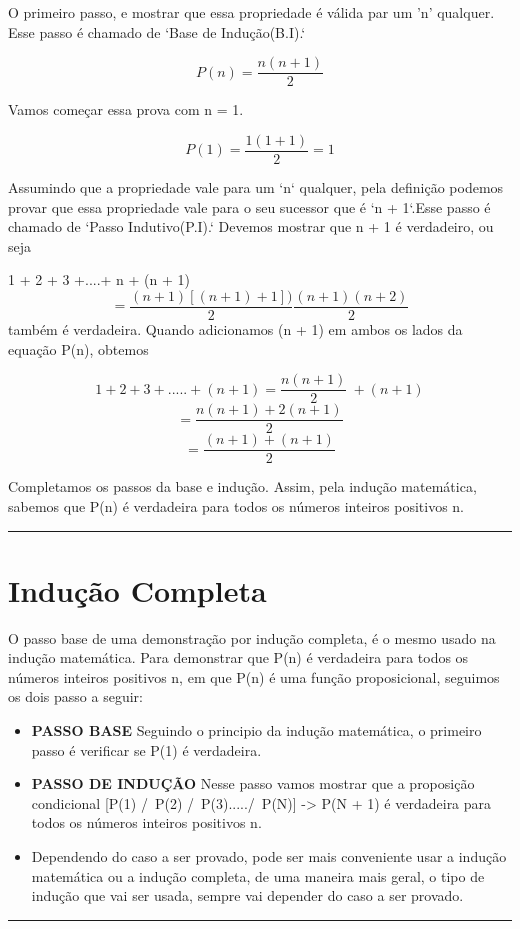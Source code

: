 \documentclass[a4paper, 10pt]{article}
\begin{document}
\begin{itemize}
\item O primeiro passo, e mostrar que essa propriedade é válida par um 'n' qualquer.
  Esse passo é chamado de `Base de Indução(B.I).`
  \begin{center}
    \[P(n)=\frac{n(n + 1)}{2}\]

    Vamos começar essa prova com n = 1.

    \[P(1) = \frac {1(1 + 1)}{2} = 1\]
  \end{center}
\item Assumindo que a propriedade vale para um `n` qualquer, pela definição podemos provar que essa propriedade vale para o seu sucessor que é `n + 1`.Esse passo é chamado de `Passo Indutivo(P.I).`
  Devemos mostrar que n + 1 é verdadeiro, ou seja
  \begin{center}
    1 + 2 + 3 +....+ n + (n + 1) \[ = \frac{(n + 1) [(n + 1) + 1])}{2}\frac{(n +1)(n + 2)}{2}\]
    também é verdadeira. Quando adicionamos (n + 1) em ambos os lados da equação P(n), obtemos

    \[1 + 2 + 3 +.....+ (n + 1) = \frac{n(n + 1)}{2}\ + (n + 1)\]
    \[ = \frac{n(n + 1) + 2(n + 1)}{2}\]
    \[ = \frac{(n + 1) + (n + 1)}{2}\]
    \item Completamos os passos da base e indução. Assim, pela indução matemática, sabemos que P(n) é verdadeira para todos os números inteiros positivos n.

    
    \end{center}
\end{itemize}
\hrule
\section{Indução Completa}
O passo base de uma demonstração por indução completa, é o mesmo usado na indução matemática. Para demonstrar que P(n) é verdadeira para todos os números inteiros positivos n, em que P(n) é uma função proposicional, seguimos os dois passo a seguir:
\begin{itemize}
\item \textbf{PASSO BASE} Seguindo o principio da indução matemática, o primeiro passo é verificar se P(1) é verdadeira.
\item \textbf{PASSO DE INDUÇÃO} Nesse passo vamos mostrar que a proposição condicional [P(1) /\ P(2) /\ P(3)...../\ P(N)] -> P(N + 1) é verdadeira para todos os números inteiros positivos n.
\item Dependendo do caso a ser provado, pode ser mais conveniente usar a indução matemática ou a indução completa, de uma maneira mais geral, o tipo de indução que vai ser usada, sempre vai depender do caso a ser provado.
\end{itemize}
\hrule
\newpage
\end{document}
